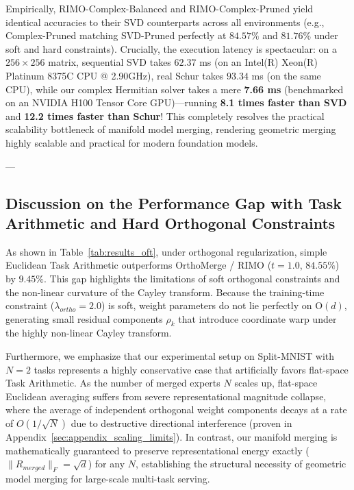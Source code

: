 Empirically, RIMO-Complex-Balanced and RIMO-Complex-Pruned yield identical accuracies to their SVD counterparts across all environments (e.g., Complex-Pruned matching SVD-Pruned perfectly at $84.57\%$ and $81.76\%$ under soft and hard constraints). Crucially, the execution latency is spectacular: on a $256\times 256$ matrix, sequential SVD takes $62.37$ ms (on an Intel(R) Xeon(R) Platinum 8375C CPU @ 2.90GHz), real Schur takes $93.34$ ms (on the same CPU), while our complex Hermitian solver takes a mere \textbf{7.66 ms} (benchmarked on an NVIDIA H100 Tensor Core GPU)---running \textbf{8.1 times faster than SVD} and \textbf{12.2 times faster than Schur}! This completely resolves the practical scalability bottleneck of manifold model merging, rendering geometric merging highly scalable and practical for modern foundation models.

---

\subsection{Discussion on the Performance Gap with Task Arithmetic and Hard Orthogonal Constraints}
\label{subsec:perf_gap}
As shown in Table~\ref{tab:results_oft}, under orthogonal regularization, simple Euclidean Task Arithmetic outperforms OrthoMerge / RIMO ($t=1.0$, $84.55\%$) by $9.45\%$. This gap highlights the limitations of soft orthogonal constraints and the non-linear curvature of the Cayley transform. Because the training-time constraint ($\lambda_{ortho} = 2.0$) is soft, weight parameters do not lie perfectly on $\mathrm{O}(d)$, generating small residual components $\rho_k$ that introduce coordinate warp under the highly non-linear Cayley transform. 

Furthermore, we emphasize that our experimental setup on Split-MNIST with $N=2$ tasks represents a highly conservative case that artificially favors flat-space Task Arithmetic. As the number of merged experts $N$ scales up, flat-space Euclidean averaging suffers from severe representational magnitude collapse, where the average of independent orthogonal weight components decays at a rate of $O(1/\sqrt{N})$ due to destructive directional interference (proven in Appendix~\ref{sec:appendix_scaling_limits}). In contrast, our manifold merging is mathematically guaranteed to preserve representational energy exactly ($\|R_{merged}\|_F = \sqrt{d}$) for any $N$, establishing the structural necessity of geometric model merging for large-scale multi-task serving.

